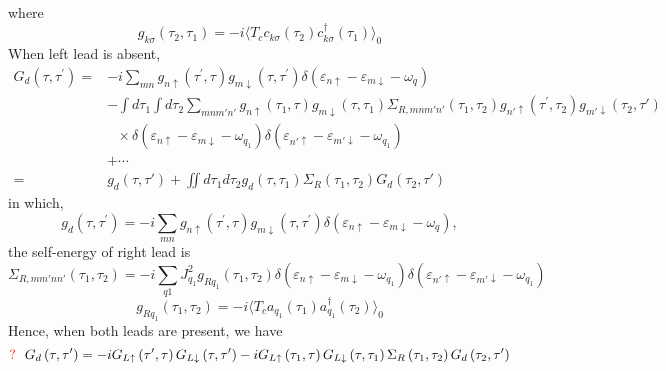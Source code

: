 \documentclass[11pt,a4paper]{book}
\begin{document}
where
\begin{equation}
g_{k\sigma}(\tau_{2}, \tau_{1}) = -i\langle T_{c}c_{k\sigma}(\tau_{2}) c_{k\sigma}^{\dag}(\tau_{1})\rangle_{0}
\end{equation}
When left lead is absent,
\begin{equation}
\begin{split}
G_{d}\left(\tau, \tau^{\prime}\right) =&-i\sum_{mn} g_{n \uparrow}\left(\tau^{\prime}, \tau\right) g_{m \downarrow}\left(\tau, \tau^{\prime}\right) \delta(\varepsilon_{n\uparrow} - \varepsilon_{m\downarrow} - \omega_{q})\\
&-\int d\tau_{1}\int d\tau_{2} \sum_{mnm'n'}g_{n \uparrow}\left(\tau_{1}, \tau\right) g_{m \downarrow}\left(\tau, \tau_{1}\right) \Sigma_{R,mnm'n' }\left(\tau_{1}, \tau_{2}\right) g_{n'\uparrow}\left(\tau^{\prime}, \tau_{2}\right)g_{m'\downarrow}(\tau_{2}, \tau') \\
&~~~\times \delta(\varepsilon_{n\uparrow} - \varepsilon_{m\downarrow} - \omega_{q_{1}})\delta(\varepsilon_{n'\uparrow} - \varepsilon_{m'\downarrow} - \omega_{q_{1}})\\
& + \cdots \\
=& g_{d}(\tau, \tau') + \iint d\tau_{1}d\tau_{2}g_{d}(\tau, \tau_{1}) \Sigma_{R}(\tau_{1}, \tau_{2}) G_{d}(\tau_{2}, \tau')
\end{split}
\end{equation}
in which, 
\begin{equation}
g_{d}\left(\tau, \tau^{\prime}\right) = -i\sum_{mn} g_{n \uparrow}\left(\tau^{\prime}, \tau\right) g_{m \downarrow}\left(\tau, \tau^{\prime}\right) \delta(\varepsilon_{n\uparrow} - \varepsilon_{m\downarrow} - \omega_{q}),
\end{equation}
the self-energy of right lead is
\begin{equation}
\Sigma_{R,mm'nn'}(\tau_{1}, \tau_{2}) = -i\sum_{q1}J_{q_{1}}^{2} g_{Rq_{1}}(\tau_{1}, \tau_{2}) \delta(\varepsilon_{n\uparrow} - \varepsilon_{m\downarrow} - \omega_{q_{1}})\delta(\varepsilon_{n'\uparrow} - \varepsilon_{m'\downarrow} - \omega_{q_{1}})
\end{equation}
\begin{equation}
g_{Rq_{1}}(\tau_{1}, \tau_{2}) = -i\langle T_{c}a_{q_{1}}(\tau_{1}) a_{q_{1}}^{\dag}(\tau_{2})\rangle_{0}
\end{equation}
Hence, when both leads are present, we have
\begin{equation}
{\color{red}{\Large{?}}}~~G_{d}\left(\tau, \tau^{\prime}\right)=-i G_{L \uparrow}\left(\tau^{\prime}, \tau\right) G_{L \downarrow}\left(\tau, \tau^{\prime}\right)-i G_{L \uparrow}\left(\tau_{1}, \tau\right) G_{L \downarrow}\left(\tau, \tau_{1}\right) \Sigma_{R }\left(\tau_{1}, \tau_{2}\right) G_{d}\left(\tau_{2}, \tau^{\prime}\right)
\label{eq:1}
\end{equation}
\end{document}
